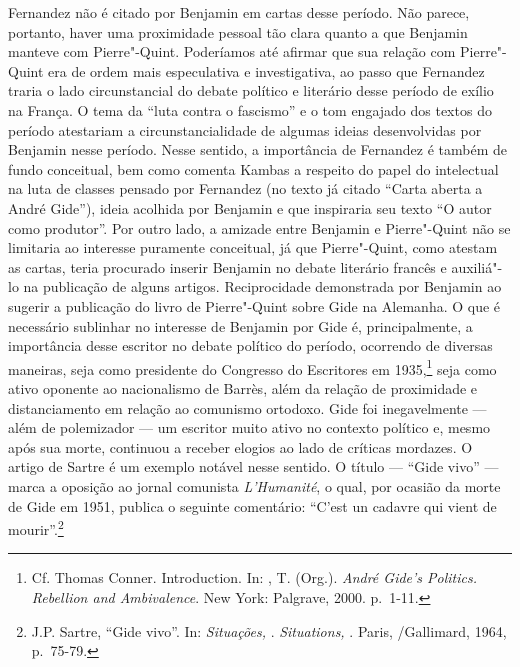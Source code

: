Fernandez não é citado por Benjamin em cartas desse período. Não parece,
portanto, haver uma proximidade pessoal tão clara quanto a que Benjamin
manteve com Pierre"-Quint. Poderíamos até afirmar que sua relação com
Pierre"-Quint era de ordem mais especulativa e investigativa, ao passo
que Fernandez traria o lado circunstancial do debate político e
literário desse período de exílio na França. O tema da ``luta contra o
fascismo'' e o tom engajado dos textos do período atestariam a
circunstancialidade de algumas ideias desenvolvidas por Benjamin nesse
período. Nesse sentido, a importância de Fernandez é também de fundo
conceitual, bem como comenta Kambas a respeito do papel do intelectual
na luta de classes pensado por Fernandez (no texto já citado ``Carta
aberta a André Gide''), ideia acolhida por Benjamin e que inspiraria seu
texto ``O autor como produtor''. Por outro lado, a amizade entre
Benjamin e Pierre"-Quint não se limitaria ao interesse puramente
conceitual, já que Pierre"-Quint, como atestam as cartas, teria procurado
inserir Benjamin no debate literário francês e auxiliá"-lo na publicação
de alguns artigos. Reciprocidade demonstrada por Benjamin ao sugerir a
publicação do livro de Pierre"-Quint sobre Gide na Alemanha. O que é
necessário sublinhar no interesse de Benjamin por Gide é,
principalmente, a importância desse escritor no debate político do
período, ocorrendo de diversas maneiras, seja como presidente do
Congresso do Escritores em 1935,\footnote{Cf. Thomas Conner.
  Introduction. In: , T. (Org.). \emph{André Gide's Politics.
  Rebellion and Ambivalence}. New York: Palgrave, 2000. p.~1-11.} seja
como ativo oponente ao nacionalismo de Barrès, além da relação de
proximidade e distanciamento em relação ao comunismo ortodoxo. Gide foi
inegavelmente --- além de polemizador --- um escritor muito ativo no
contexto político e, mesmo após sua morte, continuou a receber elogios
ao lado de críticas mordazes. O artigo de Sartre é um exemplo notável
nesse sentido. O título --- ``Gide vivo'' --- marca a oposição ao jornal
comunista \emph{L'Humanité}, o qual, por ocasião da morte de Gide em
1951, publica o seguinte comentário: ``C'est un cadavre qui vient de
mourir''.\footnote{J.P. Sartre, ``Gide vivo''. In: \emph{Situações, }.
  \emph{Situations, }. Paris, /Gallimard, 1964, p.~75-79.}

